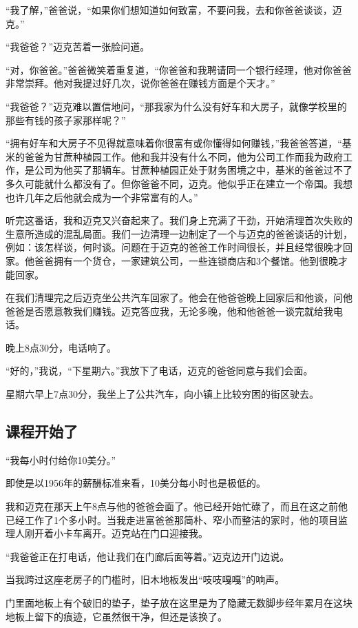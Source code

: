 “我了解，”爸爸说，“如果你们想知道如何致富，不要问我，去和你爸爸谈谈，迈克。”

“我爸爸？”迈克苦着一张脸问道。

“对，你爸爸。”爸爸微笑着重复道，“你爸爸和我聘请同一个银行经理，他对你爸爸非常崇拜。他对我提过好几次，说你爸爸在赚钱方面是个天才。”

“我爸爸？”迈克难以置信地问，“那我家为什么没有好车和大房子，就像学校里的那些有钱的孩子家那样呢？”

“拥有好车和大房子不见得就意味着你很富有或你懂得如何赚钱，”我爸爸答道，“基米的爸爸为甘蔗种植园工作。他和我并没有什么不同，他为公司工作而我为政府工作，是公司为他买了那辆车。甘蔗种植园正处于财务困境之中，基米的爸爸过不了多久可能就什么都没有了。但你爸爸不同，迈克。他似乎正在建立一个帝国。我想也许几年之后他就会成为一个非常富有的人。”

听完这番话，我和迈克又兴奋起来了。我们身上充满了干劲，开始清理首次失败的生意所造成的混乱局面。我们一边清理一边制定了一个与迈克的爸爸谈话的计划，例如：该怎样谈，何时谈。问题在于迈克的爸爸工作时间很长，并且经常很晚才回家。他爸爸拥有一个货仓，一家建筑公司，一些连锁商店和3个餐馆。他到很晚才能回家。

在我们清理完之后迈克坐公共汽车回家了。他会在他爸爸晚上回家后和他谈，问他爸爸是否愿意教我们赚钱。迈克答应我，无论多晚，他和他爸爸一谈完就给我电话。

晚上8点30分，电话响了。

“好的，”我说，“下星期六。”我放下了电话，迈克的爸爸同意与我们会面。

星期六早上7点30分，我坐上了公共汽车，向小镇上比较穷困的街区驶去。

\subsection*{课程开始了}

“我每小时付给你10美分。”

即使是以1956年的薪酬标准来看，10美分每小时也是极低的。

我和迈克在那天上午8点与他的爸爸会面了。他已经开始忙碌了，而且在这之前他已经工作了1个多小时。当我走进富爸爸那简朴、窄小而整洁的家时，他的项目监理人刚开着小卡车离开。迈克站在门口迎接我。

“我爸爸正在打电话，他让我们在门廊后面等着。”迈克边开门边说。

当我跨过这座老房子的门槛时，旧木地板发出“吱吱嘎嘎”的响声。

门里面地板上有个破旧的垫子，垫子放在这里是为了隐藏无数脚步经年累月在这块地板上留下的痕迹，它虽然很干净，但还是该换了。

